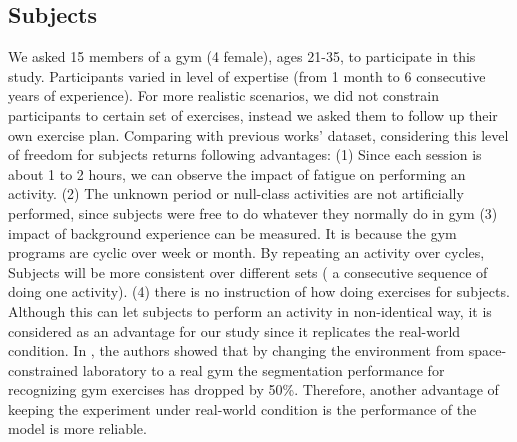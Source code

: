 \documentclass[journal,article,submit,moreauthors,pdftex]{Definitions/mdpi}
\begin{document}
\subsection{Subjects}
We asked 15 members of a gym (4 female), ages 21-35, to participate in this study. Participants varied in level of expertise (from 1 month to 6 consecutive years of experience). For more realistic scenarios, we did not constrain participants to certain set of exercises, instead we asked them to follow up their own exercise plan. Comparing with previous works' dataset, considering this level of freedom for subjects returns following advantages: (1) Since each session is about 1 to 2 hours, we can observe the impact of fatigue on performing an activity. (2) The unknown period or null-class activities are not artificially performed, since subjects were free to do whatever they normally do in gym (3) impact of background experience can be measured. It is because the gym programs are cyclic over week or month. By repeating an activity over cycles, Subjects will be more consistent over different sets ( a consecutive sequence of doing one activity). (4) there is no instruction of how doing exercises for subjects. Although this can let subjects to perform an activity in non-identical way, it is considered as an advantage for our study since it replicates the real-world condition. In \cite{morris2014recofit}, the authors showed that by changing the environment from space-constrained laboratory to a real gym the segmentation performance for recognizing gym exercises has dropped by 50\%. Therefore, another advantage of keeping the experiment under real-world condition is the performance of the model is more reliable.\\
\end{document}
